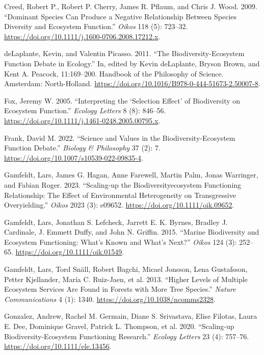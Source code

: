 \documentclass[
  letterpaper,
  DIV=11,
  numbers=noendperiod]{scrartcl}
\newlength{\cslhangindent}
\newenvironment{CSLReferences}[2] %
 {\begin{list}{}{%
  \setlength{\itemindent}{0pt}
  \setlength{\leftmargin}{0pt}
  \setlength{\parsep}{0pt}
  \ifodd #1
   \setlength{\leftmargin}{\cslhangindent}
   \setlength{\itemindent}{-1\cslhangindent}
  \fi
  \setlength{\itemsep}{#2\baselineskip}}}
 {\end{list}}
\begin{document}
\begin{CSLReferences}{1}{0}
Creed, Robert P., Robert P. Cherry, James R. Pflaum, and Chris J. Wood.
2009. {``Dominant Species Can Produce a Negative Relationship Between
Species Diversity and Ecosystem Function.''} \emph{Oikos} 118 (5):
723--32. \url{https://doi.org/10.1111/j.1600-0706.2008.17212.x}.

deLaplante, Kevin, and Valentin Picasso. 2011. {``The
Biodiversity-Ecosystem Function Debate in Ecology.''} In, edited by
Kevin deLaplante, Bryson Brown, and Kent A. Peacock, 11:169--200.
Handbook of the Philosophy of Science. Amsterdam: North-Holland.
\url{https://doi.org/10.1016/B978-0-444-51673-2.50007-8}.

Fox, Jeremy W. 2005. {``Interpreting the {`}Selection Effect{'} of
Biodiversity on Ecosystem Function.''} \emph{Ecology Letters} 8 (8):
846--56. \url{https://doi.org/10.1111/j.1461-0248.2005.00795.x}.

Frank, David M. 2022. {``Science and Values in the
Biodiversity-Ecosystem Function Debate.''} \emph{Biology \& Philosophy}
37 (2): 7. \url{https://doi.org/10.1007/s10539-022-09835-4}.

Gamfeldt, Lars, James G. Hagan, Anne Farewell, Martin Palm, Jonas
Warringer, and Fabian Roger. 2023. {``Scaling-up the
Biodiversity{\textendash}ecosystem Functioning Relationship: The Effect
of Environmental Heterogeneity on Transgressive Overyielding.''}
\emph{Oikos} 2023 (3): e09652. \url{https://doi.org/10.1111/oik.09652}.

Gamfeldt, Lars, Jonathan S. Lefcheck, Jarrett E. K. Byrnes, Bradley J.
Cardinale, J. Emmett Duffy, and John N. Griffin. 2015. {``Marine
Biodiversity and Ecosystem Functioning: What's Known and What's Next?''}
\emph{Oikos} 124 (3): 252--65. \url{https://doi.org/10.1111/oik.01549}.

Gamfeldt, Lars, Tord Snäll, Robert Bagchi, Micael Jonsson, Lena
Gustafsson, Petter Kjellander, María C. Ruiz-Jaen, et al. 2013.
{``Higher Levels of Multiple Ecosystem Services Are Found in Forests
with More Tree Species.''} \emph{Nature Communications} 4 (1): 1340.
\url{https://doi.org/10.1038/ncomms2328}.

Gonzalez, Andrew, Rachel M. Germain, Diane S. Srivastava, Elise Filotas,
Laura E. Dee, Dominique Gravel, Patrick L. Thompson, et al. 2020.
{``Scaling-up Biodiversity-Ecosystem Functioning Research.''}
\emph{Ecology Letters} 23 (4): 757--76.
\url{https://doi.org/10.1111/ele.13456}.


\end{CSLReferences}
\end{document}
